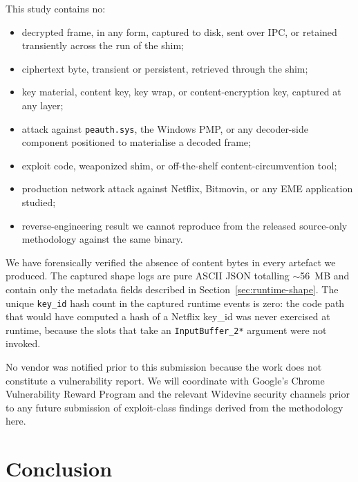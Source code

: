 \documentclass[11pt,letterpaper]{article}
\begin{document}
This study contains no:

\begin{itemize}[itemsep=1pt,topsep=2pt]
\item decrypted frame, in any form, captured to disk, sent over
      IPC, or retained transiently across the run of the shim;
\item ciphertext byte, transient or persistent, retrieved through
      the shim;
\item key material, content key, key wrap, or content-encryption
      key, captured at any layer;
\item attack against \texttt{peauth.sys}, the Windows PMP, or any
      decoder-side component positioned to materialise a decoded
      frame;
\item exploit code, weaponized shim, or off-the-shelf
      content-circumvention tool;
\item production network attack against Netflix, Bitmovin, or any
      EME application studied;
\item reverse-engineering result we cannot reproduce from the
      released source-only methodology against the same binary.
\end{itemize}

We have forensically verified the absence of content bytes in every
artefact we produced.  The captured shape logs are pure ASCII JSON
totalling $\sim$56~MB and contain only the metadata fields described
in Section~\ref{sec:runtime-shape}.  The unique \texttt{key\_id}
hash count in the captured runtime events is zero: the code path
that would have computed a hash of a Netflix key\_id was never
exercised at runtime, because the slots that take an
\texttt{InputBuffer\_2*} argument were not invoked.

No vendor was notified prior to this submission because the work
does not constitute a vulnerability report.  We will coordinate
with Google's Chrome Vulnerability Reward Program and the relevant
Widevine security channels prior to any future submission of
exploit-class findings derived from the methodology here.

\section{Conclusion}
\label{sec:conclusion}
\end{document}
